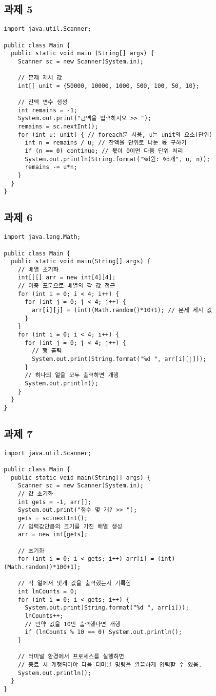 \documentclass{article}
\begin{document}
\subsection{과제 5}
\begin{lstlisting}
import java.util.Scanner;

public class Main {
  public static void main (String[] args) {
    Scanner sc = new Scanner(System.in);
    
    // 문제 제시 값 
    int[] unit = {50000, 10000, 1000, 500, 100, 50, 10};

    // 잔액 변수 생성
    int remains = -1;
    System.out.print("금액을 입력하시오 >> ");
    remains = sc.nextInt();
    for (int u: unit) { // foreach문 사용, u는 unit의 요소(단위)
      int n = remains / u; // 잔액을 단위로 나눈 몫 구하기
      if (n == 0) continue; // 몫이 0이면 다음 단위 처리
      System.out.println(String.format("%d원: %d개", u, n));
      remains -= u*n;
    }
  }
}
\end{lstlisting}
\subsection{과제 6}
\begin{lstlisting}
import java.lang.Math;

public class Main {
  public static void main(String[] args) {
    // 배열 초기화
    int[][] arr = new int[4][4];
    // 이중 포문으로 배열의 각 값 접근
    for (int i = 0; i < 4; i++) {
      for (int j = 0; j < 4; j++) {
        arr[i][j] = (int)(Math.random()*10+1); // 문제 제시 값
      }
    }
    for (int i = 0; i < 4; i++) {
      for (int j = 0; j < 4; j++) {
        // 행 출력
        System.out.print(String.format("%d ", arr[i][j]));
      }
      // 하나의 열을 모두 출력하면 개행
      System.out.println();
    }
  }
}
\end{lstlisting}
\subsection{과제 7}
\begin{lstlisting}
import java.util.Scanner;

public class Main {
  public static void main(String[] args) {
    Scanner sc = new Scanner(System.in);
    // 값 초기화
    int gets = -1, arr[];
    System.out.print("정수 몇 개? >> ");
    gets = sc.nextInt();
    // 입력값만큼의 크기를 가진 배열 생성
    arr = new int[gets];
    
    // 초기화
    for (int i = 0; i < gets; i++) arr[i] = (int)(Math.random()*100+1);
    
    // 각 열에서 몇개 값을 출력했는지 기록함
    int lnCounts = 0;
    for (int i = 0; i < gets; i++) {
      System.out.print(String.format("%d ", arr[i]));
      lnCounts++;
      // 만약 깂을 10번 출력했다면 개행
      if (lnCounts % 10 == 0) System.out.println();
    }

    // 터미널 환경에서 프로세스를 실행하면
    // 종료 시 개행되어야 다음 터미널 명령을 깔끔하게 입력할 수 있음.
    System.out.println();
  }
}
\end{lstlisting}
\end{document}
